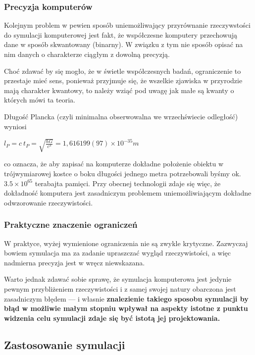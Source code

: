 \subsubsection{Precyzja komputerów}
\par{
Kolejnym problem w pewien sposób uniemożliwający przyrównanie rzeczywstości do symulacji komputerowej jest fakt, że współczesne komputery przechowują dane w sposób skwantowany (binarny). W związku z tym nie sposób opisać na nim danych o charakterze ciągłym z dowolną precyzją.
}
\par{
Choć zdawać by się mogło, że w świetle współczesnych badań, ograniczenie to przestaje mieć sens, ponieważ przyjmuje się, że wszelkie zjawiska w przyrodzie mają charakter kwantowy, to należy wziąć pod uwagę jak małe są kwanty o których mówi ta teoria.
}
\par{
Długość Plancka (czyli minimalna obserwowalna we wrzechświecie odległość) wyniosi 
\begin{center}
$l_P = c \ t_P = \sqrt{\frac{\hbar G}{c^3}} = 1,616 199(97) \times 10^{-35} m$
\end{center}
co oznacza, że aby zapisać na komputerze dokładne położenie obiektu w trójwymiarowej kostce o boku długości jednego metra potrzebowali byśmy ok. $3.5 \times 10^{65}$ terabajta pamięci. Przy obecnej technologii zdaje się więc, że dokładność komputera jest zasadniczym problemem uniemożliwiającym dokładne odwzorowanie rzeczywistości.
}

\subsubsection{Praktyczne znaczenie ograniczeń}
\par{
W praktyce, wyżej wymienione ograniczenia nie są zwykle krytyczne. Zazwyczaj bowiem symulacja ma za zadanie upraszczać wygląd rzeczywistości, a więc nadmierna precyzja jest w wręcz niewskazana.
}
\par{
Warto jednak zdawać sobie sprawę, że symulacja komputerowa jest jedynie pewnym przybliżeniem rzeczywistości i z samej swojej natury obarczona jest zasadniczym błędem --- i własnie \textbf{znalezienie takiego sposobu symulacji by błąd w możliwie małym stopniu wpływał na aspekty istotne z punktu widzenia celu symulacji zdaje się być istotą jej projektowania.}
}

\subsection{Zastosowanie symulacji}

